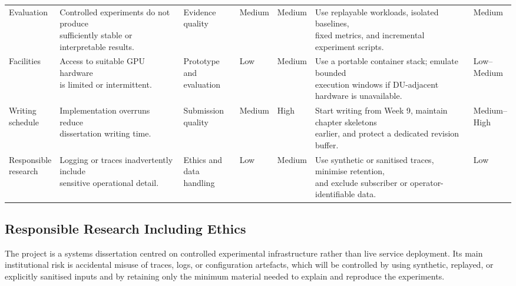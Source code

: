 \documentclass[a4paper,11pt]{article}
\begin{document}
\begin{table}[H]
{\begin{tabular}{@{}lllllll@{}}
Evaluation & \makecell[l]{Controlled experiments do not produce\\sufficiently stable or interpretable results.} & \makecell[l]{Evidence\\quality} & Medium & Medium & \makecell[l]{Use replayable workloads, isolated baselines,\\fixed metrics, and incremental experiment scripts.} & Medium \\
Facilities & \makecell[l]{Access to suitable GPU hardware\\is limited or intermittent.} & \makecell[l]{Prototype and\\evaluation} & Low & Medium & \makecell[l]{Use a portable container stack; emulate bounded\\execution windows if DU-adjacent hardware is unavailable.} & \makecell[l]{Low--\\Medium} \\
\makecell[l]{Writing\\schedule} & \makecell[l]{Implementation overruns reduce\\dissertation writing time.} & \makecell[l]{Submission\\quality} & Medium & High & \makecell[l]{Start writing from Week 9, maintain chapter skeletons\\earlier, and protect a dedicated revision buffer.} & \makecell[l]{Medium--\\High} \\
\makecell[l]{Responsible\\research} & \makecell[l]{Logging or traces inadvertently include\\sensitive operational detail.} & \makecell[l]{Ethics and\\data handling} & Low & Medium & \makecell[l]{Use synthetic or sanitised traces, minimise retention,\\and exclude subscriber or operator-identifiable data.} & Low \\
\bottomrule
\end{tabular}%
}
\end{table}

\subsection{Responsible Research Including Ethics}

The project is a systems dissertation centred on controlled experimental infrastructure rather than live service deployment. Its main institutional risk is accidental misuse of traces, logs, or configuration artefacts, which will be controlled by using synthetic, replayed, or explicitly sanitised inputs and by retaining only the minimum material needed to explain and reproduce the experiments.
\end{document}
